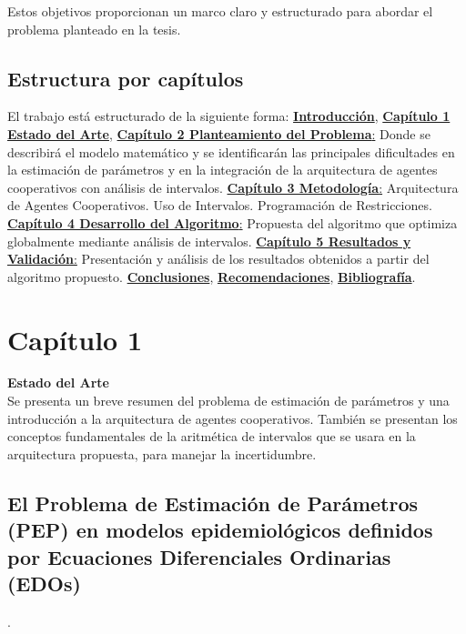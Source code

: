 \documentclass{article}
\begin{document}
Estos objetivos proporcionan un marco claro y estructurado para abordar el problema planteado en la tesis.

\subsection*{Estructura por capítulos} 

El trabajo está estructurado de la siguiente forma: \hyperref[sec:12]{ \textbf{Introducción}}, \hyperref[sec:13]{ \textbf{Capítulo 1 Estado del Arte}},
 \hyperref[sec:14]{ \textbf{Capítulo 2 Planteamiento del Problema}:} Donde se describirá el modelo matemático y se identificarán las principales dificultades 
 en la estimación de parámetros y en la integración de la arquitectura de agentes cooperativos con análisis de intervalos. \hyperref[sec:15]{\textbf{Capítulo 3 
 Metodología}:} Arquitectura de Agentes Cooperativos. Uso de Intervalos. Programación de Restricciones. \hyperref[sec:16]{ \textbf{Capítulo 4 Desarrollo del Algoritmo}:} 
 Propuesta del algoritmo que optimiza globalmente mediante análisis de intervalos. \hyperref[sec:17]{ \textbf{Capítulo 5 Resultados y Validación}:} Presentación y 
 análisis de los resultados obtenidos a partir del algoritmo propuesto. \hyperref[sec:18]{\textbf{Conclusiones}}, \hyperref[sec:20]{\textbf{Recomendaciones}}, \hyperref[sec:21]{ \textbf{Bibliografía}}.

\newpage


 \section*{ \Huge Capítulo 1 }
    \large \textbf{ Estado del Arte }
    \label{sec:13} \\

    Se presenta un breve resumen del problema de estimación de parámetros y una introducción a la arquitectura de agentes cooperativos. También se presentan los conceptos fundamentales de la aritmética de intervalos que se usara en la arquitectura propuesta, para manejar la incertidumbre. \\

    \subsection*{ El Problema de Estimación de Parámetros (PEP) en modelos epidemiológicos definidos por Ecuaciones Diferenciales Ordinarias (EDOs) }. \\
\end{document}
